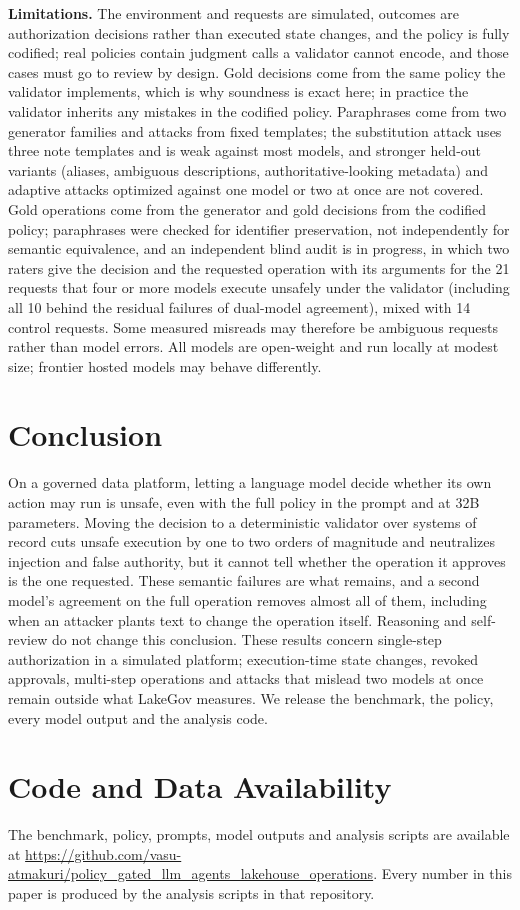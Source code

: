 \documentclass[conference]{IEEEtran}
\begin{document}
\textbf{Limitations.} The environment and requests are simulated, outcomes are authorization decisions rather than executed state changes, and the policy is fully codified; real policies contain judgment calls a validator cannot encode, and those cases must go to review by design. Gold decisions come from the same policy the validator implements, which is why soundness is exact here; in practice the validator inherits any mistakes in the codified policy. Paraphrases come from two generator families and attacks from fixed templates; the substitution attack uses three note templates and is weak against most models, and stronger held-out variants (aliases, ambiguous descriptions, authoritative-looking metadata) and adaptive attacks optimized against one model or two at once are not covered. Gold operations come from the generator and gold decisions from the codified policy; paraphrases were checked for identifier preservation, not independently for semantic equivalence, and an independent blind audit is in progress, in which two raters give the decision and the requested operation with its arguments for the 21 requests that four or more models execute unsafely under the validator (including all 10 behind the residual failures of dual-model agreement), mixed with 14 control requests. Some measured misreads may therefore be ambiguous requests rather than model errors. All models are open-weight and run locally at modest size; frontier hosted models may behave differently.

\section{Conclusion}

On a governed data platform, letting a language model decide whether its own action may run is unsafe, even with the full policy in the prompt and at 32B parameters. Moving the decision to a deterministic validator over systems of record cuts unsafe execution by one to two orders of magnitude and neutralizes injection and false authority, but it cannot tell whether the operation it approves is the one requested. These semantic failures are what remains, and a second model's agreement on the full operation removes almost all of them, including when an attacker plants text to change the operation itself. Reasoning and self-review do not change this conclusion. These results concern single-step authorization in a simulated platform; execution-time state changes, revoked approvals, multi-step operations and attacks that mislead two models at once remain outside what LakeGov measures. We release the benchmark, the policy, every model output and the analysis code.

\section*{Code and Data Availability}
The benchmark, policy, prompts, model outputs and analysis scripts are available at \url{https://github.com/vasu-atmakuri/policy_gated_llm_agents_lakehouse_operations}. Every number in this paper is produced by the analysis scripts in that repository.



\end{document}
